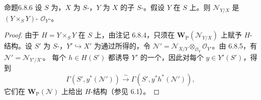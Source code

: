 \begin{SGAresult}{命题}{6.8.6}
设 $S$ 为，$X$ 为 $S$-，$Y$ 为 $X$ 的子 $S$-。假设 $Y$ 在 $S$ 上。则 $\mathcal N_{Y/X}$ 是 $(Y\times_S Y)$- $\mathcal O_Y$-。
\end{SGAresult}
\begin{proof}
由于 $H=Y\times_S Y$ 在 $S$ 上，由注记 6.8.4，只须在 $\mathbf W_{\mathrm P}(\mathcal N_{Y/X})$ 上赋予 $H$-结构。设 $S'$ 为 $S$-，$Y'\hookrightarrow X'$ 为通过所得的，令 $\mathcal N'=\mathcal N_{X/Y}\otimes_{\mathcal O_Y}\mathcal O_{Y'}$。由 6.8.5，有 $\mathcal N'=\mathcal N_{Y'/X'}$。
每个 $h\in H(S')$ 都诱导 $Y'$ 的一个，因此对每个 $y\in Y'(S')$，得到
\[
\Gamma(S',y^*(\mathcal N'))\xrightarrow\sim\Gamma(S',y^*h^*(\mathcal N')),
\]
它们在 $\mathbf W_{\mathrm P}(\mathcal N)$ 上给出 $H$-结构（参见 6.1）。
\end{proof}

